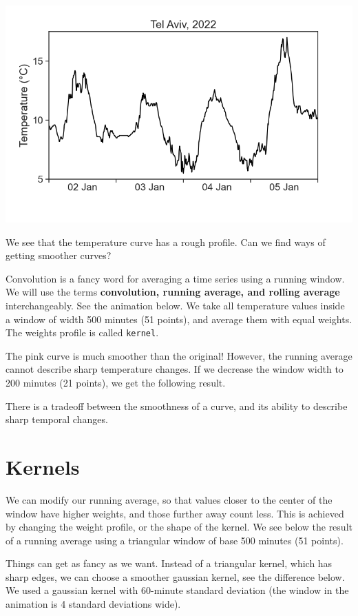 \documentclass[
  letterpaper,
  DIV=11,
  numbers=noendperiod,
  oneside]{scrreprt}
\begin{document}
\includegraphics{smoothing/convolution_TA_temperature_2022.png}

We see that the temperature curve has a rough profile. Can we find ways
of getting smoother curves?

Convolution is a fancy word for averaging a time series using a running
window. We will use the terms \textbf{convolution, running average, and
rolling average} interchangeably. See the animation below. We take all
temperature values inside a window of width 500 minutes (51 points), and
average them with equal weights. The weights profile is called
\texttt{kernel}.

The pink curve is much smoother than the original! However, the running
average cannot describe sharp temperature changes. If we decrease the
window width to 200 minutes (21 points), we get the following result.

There is a tradeoff between the smoothness of a curve, and its ability
to describe sharp temporal changes.

\hypertarget{kernels}{%
\section{Kernels}\label{kernels}}

We can modify our running average, so that values closer to the center
of the window have higher weights, and those further away count less.
This is achieved by changing the weight profile, or the shape of the
kernel. We see below the result of a running average using a triangular
window of base 500 minutes (51 points).

Things can get as fancy as we want. Instead of a triangular kernel,
which has sharp edges, we can choose a smoother gaussian kernel, see the
difference below. We used a gaussian kernel with 60-minute standard
deviation (the window in the animation is 4 standard deviations wide).
\end{document}
